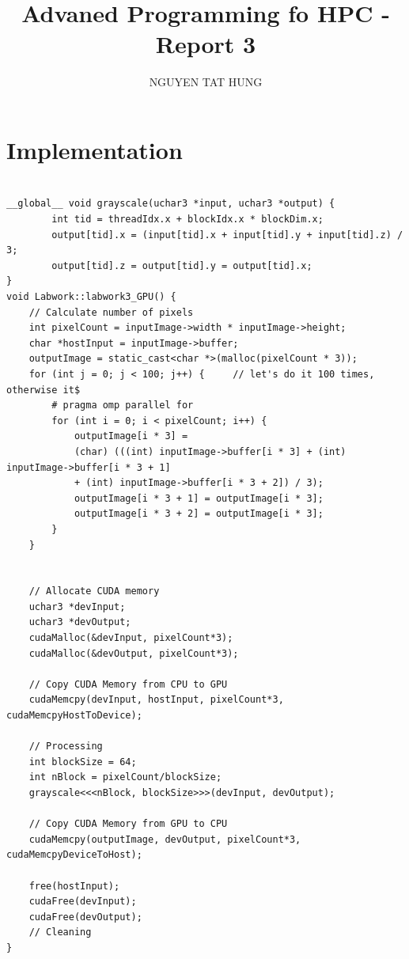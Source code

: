 \documentclass{article}
\title{Advaned Programming fo HPC - Report 3}
\author{NGUYEN TAT HUNG}
\begin{document}
\maketitle

\section*{Implementation}
\begin{lstlisting}

__global__ void grayscale(uchar3 *input, uchar3 *output) {
        int tid = threadIdx.x + blockIdx.x * blockDim.x;
        output[tid].x = (input[tid].x + input[tid].y + input[tid].z) / 3;
        output[tid].z = output[tid].y = output[tid].x;
}
void Labwork::labwork3_GPU() {
    // Calculate number of pixels
    int pixelCount = inputImage->width * inputImage->height;
    char *hostInput = inputImage->buffer;
    outputImage = static_cast<char *>(malloc(pixelCount * 3));
    for (int j = 0; j < 100; j++) {     // let's do it 100 times, otherwise it$
        # pragma omp parallel for
        for (int i = 0; i < pixelCount; i++) {
            outputImage[i * 3] = 
            (char) (((int) inputImage->buffer[i * 3] + (int) inputImage->buffer[i * 3 + 1] 
            + (int) inputImage->buffer[i * 3 + 2]) / 3);
            outputImage[i * 3 + 1] = outputImage[i * 3];
            outputImage[i * 3 + 2] = outputImage[i * 3];
        }
    }


    // Allocate CUDA memory
    uchar3 *devInput;
    uchar3 *devOutput;
    cudaMalloc(&devInput, pixelCount*3);
    cudaMalloc(&devOutput, pixelCount*3);

    // Copy CUDA Memory from CPU to GPU
    cudaMemcpy(devInput, hostInput, pixelCount*3, cudaMemcpyHostToDevice);

    // Processing
    int blockSize = 64;
    int nBlock = pixelCount/blockSize;
    grayscale<<<nBlock, blockSize>>>(devInput, devOutput);

    // Copy CUDA Memory from GPU to CPU
    cudaMemcpy(outputImage, devOutput, pixelCount*3, cudaMemcpyDeviceToHost);

    free(hostInput);
    cudaFree(devInput);
    cudaFree(devOutput);
    // Cleaning
}	


\end{lstlisting}
\end{document}
